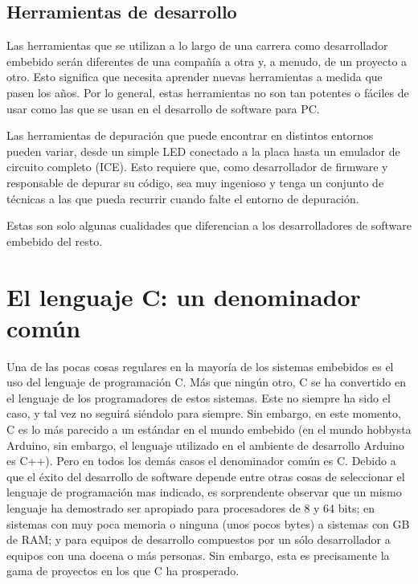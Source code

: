 \documentclass[output=paper, 
colorlinks,
citecolor=brown,
newtxmath
]{langscibook}
\begin{document}
\subsection {Herramientas de desarrollo}

Las herramientas que se utilizan a lo largo de una carrera 
como desarrollador embebido serán diferentes de una compañía a otra y, 
a menudo, de un proyecto a otro. Esto significa que necesita
aprender nuevas herramientas a medida que pasen los años.
Por lo general, estas herramientas no son tan potentes 
o fáciles de usar como las que se usan en el desarrollo de software para PC.

Las herramientas de depuración que puede encontrar en distintos entornos
pueden variar, desde un simple LED conectado a la placa hasta un emulador de 
circuito completo (ICE). Esto requiere que, como desarrollador de firmware y responsable de depurar 
su código, sea muy ingenioso y tenga un conjunto de técnicas a las que pueda recurrir
cuando falte el entorno de depuración. 

Estas son solo algunas cualidades que diferencian a los desarrolladores 
de software embebido del resto.



\section {El lenguaje C: un denominador común}

Una de las pocas cosas regulares en la mayoría de los sistemas embebidos es el uso del 
lenguaje de programación C.
Más que ningún otro, C se ha convertido en el lenguaje de los programadores de estos sistemas. 
Este no siempre ha sido el caso, y tal vez no seguirá siéndolo para siempre. 
Sin embargo, en este momento, C es lo más parecido a un estándar en el mundo embebido (en el mundo hobbysta Arduino, sin embargo, el lenguaje utilizado en el ambiente de desarrollo Arduino es C++). Pero en todos los demás casos el denominador común es C. 
Debido a que el éxito del desarrollo de software depende entre otras cosas de seleccionar 
el lenguaje de programación mas indicado, es sorprendente observar que 
un mismo lenguaje ha demostrado ser apropiado para procesadores de 8 y 64 bits; 
en sistemas con muy poca memoria o ninguna (unos pocos bytes) a sistemas
con GB de RAM; y para equipos de desarrollo compuestos por un sólo desarrollador 
a equipos con una docena o más personas. 
Sin embargo, esta es precisamente la gama de proyectos en los que C ha prosperado.
\end{document}
